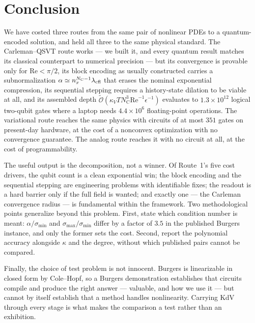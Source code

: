 \documentclass[aps,prx,twocolumn,notitlepage,superscriptaddress,floatfix,10pt]{revtex4-2}
\newcommand{\Rey}{\mathrm{Re}}
\newcommand{\Ot}{\widetilde{\mathcal{O}}}
\newcommand{\NC}{N_{\mathrm{C}}}
\begin{document}
\section{Conclusion}
\label{sec:conclusion}

We have costed three routes from the same pair of nonlinear PDEs to a quantum-encoded solution, and
held all three to the same physical standard. The Carleman--QSVT route works --- we built it, and every
quantum result matches its classical counterpart to numerical precision --- but its convergence is
provable only for $\Rey<\pi/2$, its block encoding as usually constructed carries a subnormalization
$\alpha\simeq n_x^{\NC-1}\lambda_{\rm cfl}$ that erases the nominal exponential compression, its
sequential stepping requires a history-state dilation to be viable at all, and its assembled depth
$\Ot(\kappa_V T\NC^3\Rey^{-1}\epsilon^{-1})$ evaluates to $1.3\times10^{12}$ logical two-qubit gates
where a laptop needs $4.4\times10^6$ floating-point operations. The variational route reaches the same
physics with circuits of at most $351$ gates on present-day hardware, at the cost of a nonconvex
optimization with no convergence guarantee. The analog route reaches it with no circuit at all, at the
cost of programmability.

The useful output is the decomposition, not a winner. Of Route~1's five cost drivers, the qubit count
is a clean exponential win; the block encoding and the sequential stepping are engineering problems
with identifiable fixes; the readout is a hard barrier only if the full field is wanted; and exactly
one --- the Carleman convergence radius --- is fundamental within the framework. Two methodological
points generalize beyond this problem. First, state which condition number is meant: $\alpha/\sigma_{\min}$
and $\sigma_{\max}/\sigma_{\min}$ differ by a factor of $3.5$ in the published Burgers instance, and
only the former sets the cost. Second, report the polynomial accuracy alongside $\kappa$ and the
degree, without which published pairs cannot be compared.

Finally, the choice of test problem is not innocent. Burgers is linearizable in closed form by
Cole--Hopf, so a Burgers demonstration establishes that circuits compile and produce the right answer
--- valuable, and how we use it --- but cannot by itself establish that a method handles nonlinearity.
Carrying KdV through every stage is what makes the comparison a test rather than an exhibition.
\end{document}
